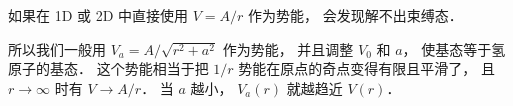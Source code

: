 
如果在 1D 或 2D 中直接使用 $V = A/r$ 作为势能， 会发现解不出束缚态．

所以我们一般用 $V_a = A/\sqrt{r^2 + a^2}$ 作为势能， 并且调整 $V_0$ 和 $a$， 使基态等于氢原子的基态． 这个势能相当于把 $1/r$ 势能在原点的奇点变得有限且平滑了， 且 $r\to\infty$ 时有 $V \to A/r$． 当 $a$ 越小， $V_a(r)$ 就越趋近 $V(r)$．
